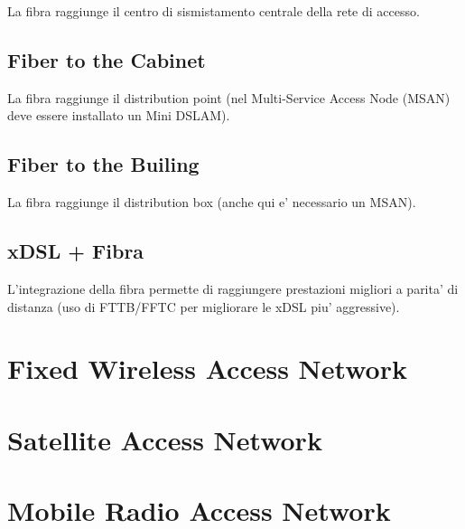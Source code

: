 La fibra raggiunge il centro di sismistamento centrale della rete di accesso.


\subsection{Fiber to the Cabinet}

La fibra raggiunge il distribution point (nel Multi-Service Access Node (MSAN) deve essere installato un Mini DSLAM).


\subsection{Fiber to the Builing}

La fibra raggiunge il distribution box (anche qui e' necessario un MSAN).


\subsection{xDSL + Fibra}

L'integrazione della fibra permette di raggiungere prestazioni migliori a parita' di distanza (uso di FTTB/FFTC per migliorare le xDSL piu' aggressive).


\section{Fixed Wireless Access Network}

\section{Satellite Access Network}

\section{Mobile Radio Access Network}
